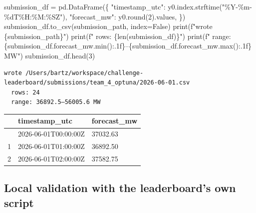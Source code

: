 \documentclass[
  english,
  letterpaper,
]{scrbook}
\newenvironment{Shaded}{\begin{snugshade}}{\end{snugshade}}
\newcommand{\BuiltInTok}[1]{\textcolor[rgb]{0.00,0.23,0.31}{#1}}
\newcommand{\DecValTok}[1]{\textcolor[rgb]{0.68,0.00,0.00}{#1}}
\newcommand{\NormalTok}[1]{\textcolor[rgb]{0.00,0.23,0.31}{#1}}
\newcommand{\OperatorTok}[1]{\textcolor[rgb]{0.37,0.37,0.37}{#1}}
\newcommand{\SpecialCharTok}[1]{\textcolor[rgb]{0.37,0.37,0.37}{#1}}
\newcommand{\SpecialStringTok}[1]{\textcolor[rgb]{0.13,0.47,0.30}{#1}}
\newcommand{\StringTok}[1]{\textcolor[rgb]{0.13,0.47,0.30}{#1}}
\newcommand{\VariableTok}[1]{\textcolor[rgb]{0.07,0.07,0.07}{#1}}
\newcounter{none} %
\begin{document}
\begin{Shaded}
\begin{Highlighting}[]
\NormalTok{submission\_df }\OperatorTok{=}\NormalTok{ pd.DataFrame(\{}
    \StringTok{"timestamp\_utc"}\NormalTok{: y0.index.strftime(}\StringTok{"\%Y{-}\%m{-}}\SpecialCharTok{\%d}\StringTok{T\%H:\%M:\%SZ"}\NormalTok{),}
    \StringTok{"forecast\_mw"}\NormalTok{:   y0.}\BuiltInTok{round}\NormalTok{(}\DecValTok{2}\NormalTok{).values,}
\NormalTok{\})}
\NormalTok{submission\_df.to\_csv(submission\_path, index}\OperatorTok{=}\VariableTok{False}\NormalTok{)}
\BuiltInTok{print}\NormalTok{(}\SpecialStringTok{f"wrote }\SpecialCharTok{\{}\NormalTok{submission\_path}\SpecialCharTok{\}}\SpecialStringTok{"}\NormalTok{)}
\BuiltInTok{print}\NormalTok{(}\SpecialStringTok{f"  rows: }\SpecialCharTok{\{}\BuiltInTok{len}\NormalTok{(submission\_df)}\SpecialCharTok{\}}\SpecialStringTok{"}\NormalTok{)}
\BuiltInTok{print}\NormalTok{(}\SpecialStringTok{f"  range: }\SpecialCharTok{\{}\NormalTok{submission\_df}\SpecialCharTok{.}\NormalTok{forecast\_mw}\SpecialCharTok{.}\BuiltInTok{min}\NormalTok{()}\SpecialCharTok{:.1f\}}\SpecialStringTok{–}\SpecialCharTok{\{}\NormalTok{submission\_df}\SpecialCharTok{.}\NormalTok{forecast\_mw}\SpecialCharTok{.}\BuiltInTok{max}\NormalTok{()}\SpecialCharTok{:.1f\}}\SpecialStringTok{ MW"}\NormalTok{)}
\NormalTok{submission\_df.head(}\DecValTok{3}\NormalTok{)}
\end{Highlighting}
\end{Shaded}

\begin{verbatim}
wrote /Users/bartz/workspace/challenge-leaderboard/submissions/team_4_optuna/2026-06-01.csv
  rows: 24
  range: 36892.5–56005.6 MW
\end{verbatim}

\protect{}\label{live-submission-write}
{\def\LTcaptype{none} %
\begin{longtable}[]{@{}lll@{}}
\toprule\noalign{}
& timestamp\_utc & forecast\_mw \\
\midrule\noalign{}
\endhead
\bottomrule\noalign{}
\endlastfoot
0 & 2026-06-01T00:00:00Z & 37032.63 \\
1 & 2026-06-01T01:00:00Z & 36892.50 \\
2 & 2026-06-01T02:00:00Z & 37582.75 \\
\end{longtable}
}

\subsection{Local validation with the leaderboard's own
script}\label{local-validation-with-the-leaderboards-own-script}
\end{document}
